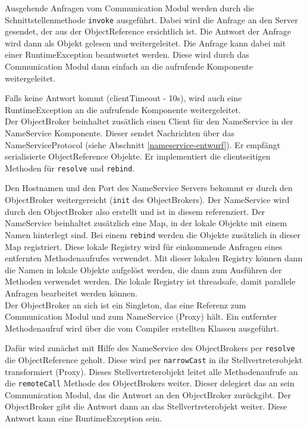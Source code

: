 \documentclass{article}
\begin{document}
Ausgehende Anfragen vom Communication Modul werden durch die Schnittstellenmethode \texttt{invoke} ausgeführt.
Dabei wird die Anfrage an den Server gesendet, der aus der ObjectReference ersichtlich ist. Die Antwort der Anfrage
wird dann als Objekt gelesen und weitergeleitet. Die Anfrage kann dabei mit einer RuntimeException beantwortet werden.
Diese wird durch das Communication Modul dann einfach an die aufrufende Komponente weitergeleitet.

Falls keine Antwort kommt (clientTimeout - 10s), wird auch eine RuntimeException an die aufrufende Komponente
weitergeleitet.\\

Der ObjectBroker beinhaltet zusätlich einen Client für den NameService in der NameService Komponente. Dieser sendet
Nachrichten über das NameServiceProtocol (siehe Abschnitt \ref{nameservice-entwurf}). Er empfängt serialisierte
ObjectReference Objekte. Er implementiert die clientseitigen Methoden für \texttt{resolve} und \texttt{rebind}.

Den Hostnamen und den Port des NameService Servers bekommt er durch den ObjectBroker weitergereicht
(\texttt{init} des ObjectBrokers). Der NameService wird durch den ObjectBroker also erstellt und ist in diesem
referenziert. Der NameService beinhaltet zusätzlich eine Map, in der lokale Objekte mit einem Namen hinterlegt sind.
Bei einem \texttt{rebind} werden die Objekte zusätzlich in dieser Map registriert.
Diese lokale Registry wird für einkommende Anfragen eines entfernten Methodenaufrufes verwendet. Mit dieser lokalen
Registry können dann die Namen in lokale Objekte aufgelöst werden, die dann zum Ausführen der Methoden verwendet werden.
Die lokale Registry ist threadsafe, damit parallele Anfragen bearbeitet werden können.\\

Der ObjectBroker an sich ist ein Singleton, das eine Referenz zum Communication Modul und zum NameService (Proxy) hält.
Ein entfernter Methodenaufruf wird über die vom Compiler erstellten Klassen ausgeführt.

Dafür wird zunächst mit Hilfe des NameService des ObjectBrokers per \texttt{resolve} die ObjectReference geholt. Diese
wird per \texttt{narrowCast} in ihr Stellvertreterobjekt transformiert (Proxy). Dieses Stellvertreterobjekt leitet alle
Methodenaufrufe an die \texttt{remoteCall} Methode des ObjectBrokers weiter. Dieser delegiert das an sein Communication
Modul, das die Antwort an den ObjectBroker zurückgibt. Der ObjectBroker gibt die Antwort dann an das
Stellvertreterobjekt weiter. Diese Antwort kann eine RuntimeException sein.
\end{document}
